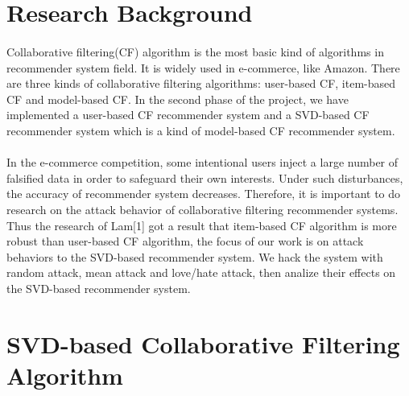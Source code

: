 \documentclass[a4paper, 12pt]{article}
\theoremstyle{definition}
\begin{document}

\tableofcontents
\pagebreak


\section{Research Background}
\paragraph{}Collaborative filtering(CF) algorithm is the most basic kind of algorithms in recommender system field. It is widely used in e-commerce, like Amazon. There are three kinds of collaborative filtering algorithms: user-based CF, item-based CF and model-based CF. In the second phase of the project, we have implemented a user-based CF recommender system and a SVD-based CF recommender system which is a kind of model-based CF recommender system. 
\paragraph{}In the e-commerce competition, some intentional users inject a large number of falsified data in order to safeguard their own interests. Under such disturbances, the accuracy of recommender system decreases. Therefore, it is important to do research on the attack behavior of collaborative filtering recommender systems. Thus the research of Lam[1] got a result that item-based CF algorithm is more robust than user-based CF algorithm, the focus of our work is on attack behaviors to the SVD-based recommender system. We hack the system with random attack, mean attack and love/hate attack, then analize their effects on the SVD-based recommender system.



\section{SVD-based Collaborative Filtering Algorithm}
\end{document}
